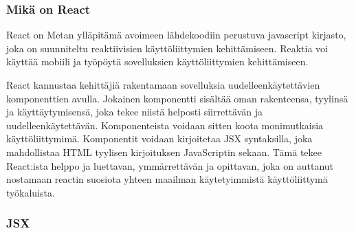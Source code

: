 

\subsubsection{Mikä on React}



React on Metan ylläpitämä avoimeen lähdekoodiin perustuva javascript kirjasto, joka on suunniteltu reaktiivisien käyttöliittymien kehittämiseen.\citemissing
%
Reaktia voi käyttää mobiili ja työpöytä sovelluksien käyttöliittymien kehittämiseen. 
\medskip







%

React kannustaa kehittäjiä rakentamaan sovelluksia uudelleenkäytettävien komponenttien avulla.
Jokainen komponentti sisältää oman rakenteensa, tyylinsä ja käyttäytymisensä, joka tekee niistä helposti siirrettävän ja uudelleenkäytettävän.
Komponenteista voidaan sitten koota monimutkaisia käyttöliittymimä. 
%
Komponentit voidaan kirjoitetaa JSX syntaksilla, joka mahdollistaa HTML tyylisen kirjoituksen JavaScriptin sekaan.
Tämä tekee React:ista helppo ja luettavan, ymmärrettävän ja opittavan, joka on auttanut nostamaan reactin suosiota yhteen maailman käytetyimmistä käyttöliittymä työkaluista.
\medskip









\subsubsection{JSX}



